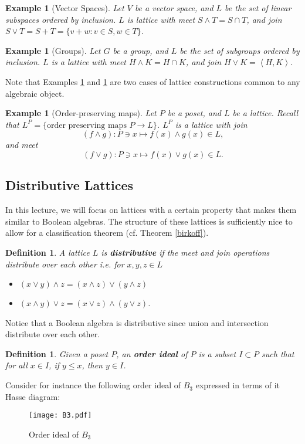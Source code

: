 \documentclass[11pt]{article}
\newtheorem{definition}[theorem]{Definition}
\newtheorem{example}[theorem]{Example}
\newcommand{\It}[1]{\textit{#1}}
\newcommand{\Bf}[1]{\textbf{#1}}
\newcommand{\wed}{\wedge}
\newcommand{\keyword}[1]{\Bf{\It{#1}}}
\begin{document}
\begin{example}[Vector Spaces] \label{vspace}
Let $V$ be a vector space, and $L$ be the set of linear subspaces ordered by inclusion. $L$ is lattice with meet $S \wed T=S \cap T$, and join $S \vee T=S + T=\{v + w : v \in S, w \in T \}$.
\end{example}

\begin{example}[Groups] \label{group}
Let $G$ be a group, and $L$ be the set of subgroups ordered by inclusion. $L$ is a lattice with meet $H \wed K=H \cap K$, and join $H \vee K=\left\langle H,K \right\rangle$.
\end{example}

Note that Examples \ref{vspace} and \ref{group} are two cases of lattice constructions common to any algebraic object.

\begin{example}[Order-preserving maps]
Let $P$ be a poset, and $L$ be a lattice. Recall that $L^P=\{\text{order preserving maps } P \rightarrow L \}$. $L^P$ is a lattice with join $$(f \wed g): P \ni x \mapsto f(x) \wed g(x) \in L,$$ and meet $$(f \vee g): P \ni x \mapsto f(x) \vee g(x) \in L.$$
\end{example}

\subsection*{Distributive Lattices}
In this lecture, we will focus on lattices with a certain property that makes them similar to Boolean algebras. The structure of these lattices is sufficiently nice to allow for a classification theorem (cf. Theorem \ref{birkoff}).
\begin{definition} \label{distributive}
A lattice $L$ is \keyword{distributive} if the meet and join operations distribute over each other i.e. for $x,y,z \in L$
\begin{itemize}
\item[(i)] $(x \vee y) \wed z= (x \wed z) \vee (y \wed z)$
\item[(ii)] $(x \wed y) \vee z= (x \vee z) \wed (y \vee z)$.
\end{itemize}
\end{definition}
Notice that a Boolean algebra is distributive since union and intersection distribute over each other.
\begin{definition}
Given a poset $P$, an \keyword{order ideal} of $P$ is a subset $I \subset P$ such that for all $x \in I$, if $y \leq x$, then $y \in I$.
\end{definition}
Consider for instance the following order ideal of $B_3$ expressed in terms of it Hasse diagram:
\begin{figure}[h]
  \centering
  \texttt{[image: B3.pdf]}
  \caption{Order ideal of $B_3$}
\end{figure}
\end{document}
